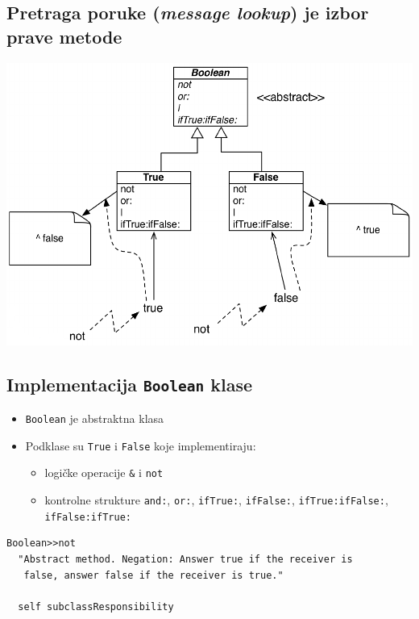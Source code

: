 \documentclass[presentation]{beamer}
\begin{document}
\subsection{Pretraga poruke (\emph{message lookup}) je izbor prave metode}
\label{sec:org49845f8}

\begin{center}
\includegraphics[width=.9\linewidth]{./slike/boolean_not_lookup.png}
\end{center}

\subsection{Implementacija \texttt{Boolean} klase}
\label{sec:org4fb8f66}

\begin{itemize}
\item \texttt{Boolean} je abstraktna klasa
\item Podklase su \texttt{True} i \texttt{False} koje implementiraju:
\begin{itemize}
\item logičke operacije \texttt{\&} i \texttt{not}
\item kontrolne strukture \texttt{and:}, \texttt{or:}, \texttt{ifTrue:}, \texttt{ifFalse:}, \texttt{ifTrue:ifFalse:},
\texttt{ifFalse:ifTrue:}
\end{itemize}
\end{itemize}

\begin{verbatim}
Boolean>>not
  "Abstract method. Negation: Answer true if the receiver is
   false, answer false if the receiver is true."

  self subclassResponsibility
\end{verbatim}
\end{document}
